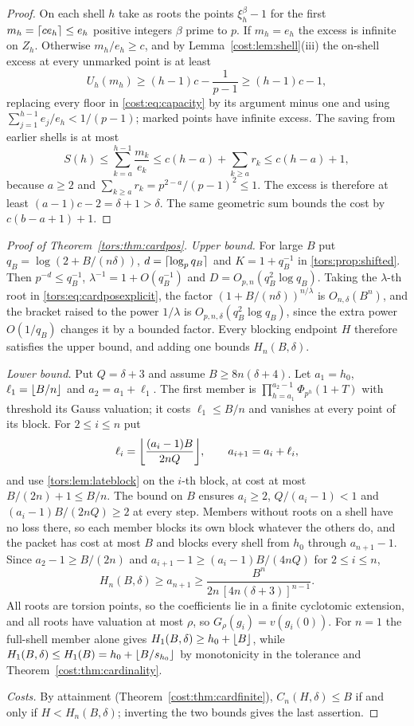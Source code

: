 \begin{proof}
On each shell $h$ take as roots the points $\xi_h^\beta-1$ for the first
$m_h=\lceil ce_h\rceil\le e_h$ positive integers $\beta$ prime to $p$. If $m_h=e_h$ the excess is
infinite on $Z_h$. Otherwise $m_h/e_h\ge c$, and by Lemma~\ref{cost:lem:shell}(iii) the
on-shell excess at every unmarked point is at least
\[
 U_h(m_h)\ge(h-1)c-\frac1{p-1}\ge(h-1)c-1 ,
\]
replacing every floor in \eqref{cost:eq:capacity} by its argument minus one and using
$\sum_{j=1}^{h-1}e_j/e_h<1/(p-1)$; marked points have infinite excess. The saving from
earlier shells is at most
\[
 S(h)\le\sum_{k=a}^{h-1}\frac{m_k}{e_k}\le c(h-a)+\sum_{k\ge a}r_k\le c(h-a)+1,
\]
because $a\ge2$ and $\sum_{k\ge a}r_k=p^{2-a}/(p-1)^2\le1$. The excess is therefore at least
$(a-1)c-2=\delta+1>\delta$. The same geometric sum bounds the cost by $c(b-a+1)+1$.
\end{proof}

\begin{proof}[Proof of Theorem~\ref{tors:thm:cardpos}]
\emph{Upper bound.} For large $B$ put $q_B=\log(2+B/(n\delta))$, $d=\lceil\log_pq_B\rceil$ and
$K=1+q_B^{-1}$ in \cref{tors:prop:shifted}. Then $p^{-d}\le q_B^{-1}$,
$\lambda^{-1}=1+O(q_B^{-1})$ and $D=O_{p,n}(q_B^2\log q_B)$. Taking the $\lambda$-th root
in \eqref{tors:eq:cardposexplicit}, the factor $(1+B/(n\delta))^{n/\lambda}$ is
$O_{n,\delta}(B^n)$, and the bracket raised to the power $1/\lambda$ is
$O_{p,n,\delta}(q_B^2\log q_B)$, since the extra power $O(1/q_B)$ changes it by a bounded
factor. Every blocking endpoint $H$ therefore satisfies the upper bound, and adding one
bounds $H_n(B,\delta)$.

\emph{Lower bound.} Put $Q=\delta+3$ and assume $B\ge8n(\delta+4)$. Let $a_1=h_0$,
$\ell_1=\lfloor B/n\rfloor$ and $a_2=a_1+\ell_1$. The first member is
$\prod_{h=a_1}^{a_2-1}\Phi_{p^h}(1+T)$ with threshold its Gauss valuation; it costs
$\ell_1\le B/n$ and vanishes at every point of its block. For $2\le i\le n$ put
\[
 \ell_i=\floor*{\frac{(a_i-1)B}{2nQ}},\qquad a_{i+1}=a_i+\ell_i ,
\]
and use \cref{tors:lem:lateblock} on the $i$-th block, at cost at most $B/(2n)+1\le B/n$.
The bound on $B$ ensures $a_i\ge2$, $Q/(a_i-1)<1$ and $(a_i-1)B/(2nQ)\ge2$ at every step.
Members without roots on a shell have no loss there, so each member blocks its own block
whatever the others do, and the packet has cost at most $B$ and blocks every shell from
$h_0$ through $a_{n+1}-1$. Since $a_2-1\ge B/(2n)$ and
$a_{i+1}-1\ge(a_i-1)B/(4nQ)$ for $2\le i\le n$,
\[
 H_n(B,\delta)\ge a_{n+1}\ge\frac{B^n}{2n\,[4n(\delta+3)]^{n-1}} .
\]
All roots are torsion points, so the coefficients lie in a finite cyclotomic extension, and
all roots have valuation at most $\rho$, so $G_\rho(g_i)=v(g_i(0))$. For $n=1$ the full-shell
member alone gives $H_1(B,\delta)\ge h_0+\lfloor B\rfloor$, while $H_1(B,\delta)\le H_1(B)
=h_0+\lfloor B/s_{h_0}\rfloor$ by monotonicity in the tolerance and
Theorem~\ref{cost:thm:cardinality}.

\emph{Costs.} By attainment (Theorem~\ref{cost:thm:cardfinite}), $C_n(H,\delta)\le B$ if and
only if $H<H_n(B,\delta)$; inverting the two bounds gives the last assertion.
\end{proof}

